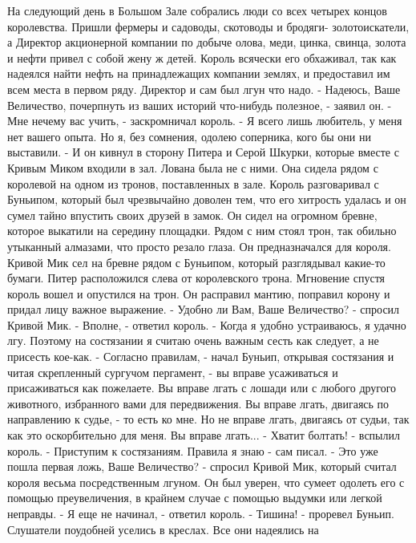     На следующий день в Большом Зале собрались люди со всех четырех 
концов королевства. Пришли фермеры и садоводы, скотоводы и бродяги-
золотоискатели, а Директор акционерной компании по добыче олова, меди, 
цинка, свинца, золота и нефти привел с собой жену ж детей. Король 
всячески его обхаживал, так как надеялся найти нефть на принадлежащих 
компании землях, и предоставил им всем места в первом ряду.
    Директор и сам был лгун что надо.
    - Надеюсь, Ваше Величество, почерпнуть из ваших историй что-нибудь 
полезное, - заявил он.
    - Мне нечему вас учить, - заскромничал король. - Я всего лишь 
любитель, у меня нет вашего опыта. Но я, без сомнения, одолею 
соперника, кого бы они ни выставили. - И он кивнул в сторону Питера и 
Серой Шкурки, которые вместе с Кривым Миком входили в зал.
    Лована была не с ними. Она сидела рядом с королевой на одном из 
тронов, поставленных в зале.
    Король разговаривал с Буньипом, который был чрезвычайно доволен 
тем, что его хитрость удалась и он сумел тайно впустить своих друзей в 
замок. Он сидел на огромном бревне, которое выкатили на середину 
площадки. Рядом с ним стоял трон, так обильно утыканный алмазами, что 
просто резало глаза. Он предназначался для короля. Кривой Мик сел на 
бревне рядом с Буньипом, который разглядывал какие-то бумаги. Питер 
расположился слева от королевского трона.
    Мгновение спустя король вошел и опустился на трон. Он расправил 
мантию, поправил корону и придал лицу важное выражение.
    - Удобно ли Вам, Ваше Величество? - спросил Кривой Мик.
    - Вполне, - ответил король. - Когда я удобно устраиваюсь, я удачно 
лгу. Поэтому на состязании я считаю очень важным сесть как следует, а 
не присесть кое-как.
    - Согласно правилам, - начал Буньип, открывая состязания и читая 
скрепленный сургучом пергамент, - вы вправе усаживаться и 
присаживаться как пожелаете. Вы вправе лгать с лошади или с любого 
другого животного, избранного вами для передвижения. Вы вправе лгать, 
двигаясь по направлению к судье, - то есть ко мне. Но не вправе лгать, 
двигаясь от судьи, так как это оскорбительно для меня. Вы вправе 
лгать...
    - Хватит болтать! - вспылил король. - Приступим к состязаниям. 
Правила я знаю - сам писал.
    - Это уже пошла первая ложь, Ваше Величество? - спросил Кривой 
Мик, который считал короля весьма посредственным лгуном. Он был 
уверен, что сумеет одолеть его с помощью преувеличения, в крайнем 
случае с помощью выдумки или легкой неправды.
    - Я еще не начинал, - ответил король.
    - Тишина! - проревел Буньип.
    Слушатели поудобней уселись в креслах. Все они надеялись на 
